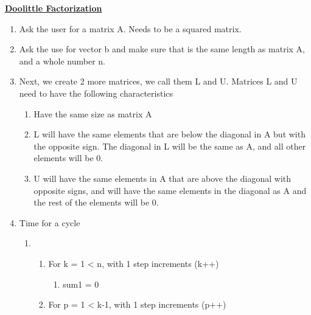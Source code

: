 \documentclass[12pt]{article}
\renewcommand{\_}{\kern-1.5pt\textunderscore\kern-1.5pt}
\begin{document}
\textbf{\uline{Doolittle Factorization }}\par


\vspace{\baselineskip}
\begin{enumerate}
	\item Ask the user for a matrix A. Needs to be a squared matrix. \par

	\item Ask the use for vector b and make sure that is the same length as matrix A, and a whole number n. \par

	\item Next, we create 2 more matrices, we call them L and U. Matrices L and U need to have the following characteristics\par

\begin{enumerate}
	\item Have the same size as matrix A \par

	\item L will have the same elements that are below the diagonal in A but with the opposite sign. The diagonal in L will be the same as A, and all other elements will be 0. \par

	\item U will have the same elements in A that are above the diagonal with opposite signs, and will have the same elements in the diagonal as A and the rest of the elements will be 0.\par


\end{enumerate}
	\item Time for a cycle\par

\begin{enumerate}
	\item \begin{enumerate}
	\item For k = 1 < n, with 1 step increments (k++)\par

\begin{enumerate}
	\item sum1 = 0\par


\end{enumerate}
	\item For p = 1 < k-1, with 1 step increments (p++)\par


\end{enumerate}
\end{enumerate}
\end{enumerate}
\end{document}
